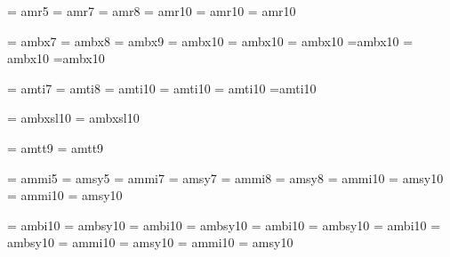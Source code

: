 \Font\prmfive	= amr5
\Font\prmseven	= amr7
\Font\prmeight	= amr8
\Font\prmten	= amr10
\Font\prmeleven = amr10 \sc \mh
\Font\prmtwelve = amr10 \sc \mi

\Font\prbseven	= ambx7
\Font\prbeight	= ambx8
\Font\prbnine	= ambx9
\Font\prbten	= ambx10
\Font\prbeleven = ambx10 \sc \mh
\Font\prbtwelve = ambx10 \sc \mi
\Font\prbfourteen=ambx10 \sc \mii
\Font\prbsixteen= ambx10 \sc \miii
\Font\prbeighteen=ambx10 \sc \miii

\Font\priseven	= amti7
\Font\prieight	= amti8
\Font\priten	= amti10
\Font\prieleven = amti10 \sc \mh
\Font\pritwelve = amti10 \sc \mi
\Font\prifourteen=amti10 \sc \mii

\Font\prbiten	= ambxsl10
\Font\prbieleven= ambxsl10 \sc \mh

\Font\lgseven	= amtt9
\Font\lgnine	= amtt9

\font\mifive	= ammi5			\font\syfive	= amsy5
\font\miseven	= ammi7			\font\syseven	= amsy7
\font\mieight	= ammi8			\font\syeight	= amsy8
\font\miten	= ammi10		\font\syten	= amsy10
\font\mieleven	= ammi10 \sc \mh	\font\syeleven	= amsy10 \sc \mh

\font\bmiten	 = ambi10		\font\bsyten	 = ambsy10
\font\bmieleven	 = ambi10 \sc \mh	\font\bsyeleven	 = ambsy10 \sc \mh
\font\bmitwelve	 = ambi10 \sc \mi	\font\bsytwelve	 = ambsy10 \sc \mi
\font\bmifourteen= ambi10 \sc \mii	\font\bsyfourteen= ambsy10 \sc \mii
\font\bmisixteen = ammi10 \sc \miii	\font\bsysixteen = amsy10  \sc \miii
\font\bmieighteen= ammi10 \sc \miii	\font\bsyeighteen= amsy10  \sc \miii
